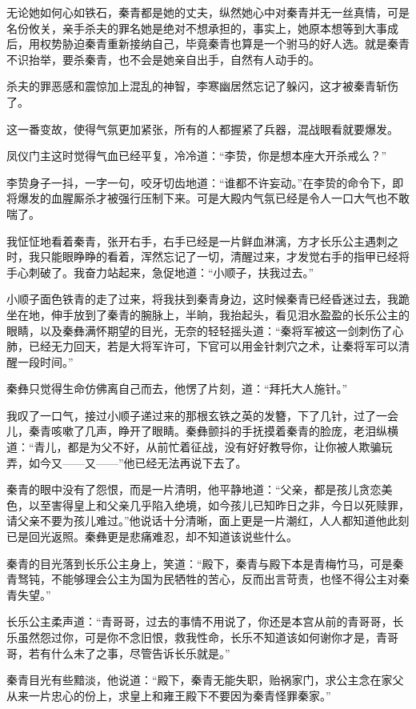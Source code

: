 无论她如何心如铁石，秦青都是她的丈夫，纵然她心中对秦青并无一丝真情，可是名份攸关，亲手杀夫的罪名她是绝对不想承担的，事实上，她原本想等到大事成后，用权势胁迫秦青重新接纳自己，毕竟秦青也算是一个驸马的好人选。就是秦青不识抬举，要杀秦青，也不会是她亲自出手，自然有人动手的。

杀夫的罪恶感和震惊加上混乱的神智，李寒幽居然忘记了躲闪，这才被秦青斩伤了。

这一番变故，使得气氛更加紧张，所有的人都握紧了兵器，混战眼看就要爆发。

凤仪门主这时觉得气血已经平复，冷冷道：“李贽，你是想本座大开杀戒么？”

李贽身子一抖，一字一句，咬牙切齿地道：“谁都不许妄动。”在李贽的命令下，即将爆发的血腥厮杀才被强行压制下来。可是大殿内气氛已经是令人一口大气也不敢喘了。

我怔怔地看着秦青，张开右手，右手已经是一片鲜血淋漓，方才长乐公主遇刺之时，我只能眼睁睁的看着，浑然忘记了一切，清醒过来，才发觉右手的指甲已经将手心刺破了。我奋力站起来，急促地道：“小顺子，扶我过去。”

小顺子面色铁青的走了过来，将我扶到秦青身边，这时候秦青已经昏迷过去，我跪坐在地，伸手放到了秦青的腕脉上，半晌，我抬起头，看见泪水盈盈的长乐公主的眼睛，以及秦彝满怀期望的目光，无奈的轻轻摇头道：“秦将军被这一剑刺伤了心肺，已经无力回天，若是大将军许可，下官可以用金针刺穴之术，让秦将军可以清醒一段时间。”

秦彝只觉得生命仿佛离自己而去，他愣了片刻，道：“拜托大人施针。”

我叹了一口气，接过小顺子递过来的那根玄铁之英的发簪，下了几针，过了一会儿，秦青咳嗽了几声，睁开了眼睛。秦彝颤抖的手抚摸着秦青的脸庞，老泪纵横道：“青儿，都是为父不好，从前忙着征战，没有好好教导你，让你被人欺骗玩弄，如今又——又——”他已经无法再说下去了。

秦青的眼中没有了怨恨，而是一片清明，他平静地道：“父亲，都是孩儿贪恋美色，以至害得皇上和父亲几乎陷入绝境，如今孩儿已知昨日之非，今日以死赎罪，请父亲不要为孩儿难过。”他说话十分清晰，面上更是一片潮红，人人都知道他此刻已是回光返照。秦彝更是悲痛难忍，却不知道该说些什么。

秦青的目光落到长乐公主身上，笑道：“殿下，秦青与殿下本是青梅竹马，可是秦青驽钝，不能够理会公主为国为民牺牲的苦心，反而出言苛责，也怪不得公主对秦青失望。”

长乐公主柔声道：“青哥哥，过去的事情不用说了，你还是本宫从前的青哥哥，长乐虽然怨过你，可是你不念旧恨，救我性命，长乐不知道该如何谢你才是，青哥哥，若有什么未了之事，尽管告诉长乐就是。”

秦青目光有些黯淡，他说道：“殿下，秦青无能失职，贻祸家门，求公主念在家父从来一片忠心的份上，求皇上和雍王殿下不要因为秦青怪罪秦家。”


